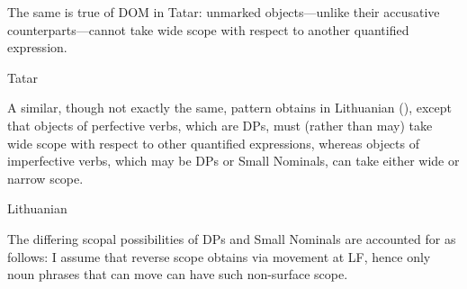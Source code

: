 \documentclass[output=paper]{langsci/langscibook}
\begin{document}
The same is true of DOM in Tatar: 
unmarked objects—unlike their accusative counterparts—cannot take wide scope with respect to another quantified expression.

\ea%
    \label{pereex:key:21}
    Tatar 
    \z 
\z 

A similar, though not exactly the same, pattern obtains in Lithuanian (\citealt{GillonArmoskaite2015}), 
except that objects of perfective verbs, which are DPs, must (rather than may) take wide scope with respect to other quantified expressions, 
whereas objects of imperfective verbs, which may be DPs or Small Nominals, can take either wide or narrow scope.

\ea%
    \label{pereex:key:22}
    Lithuanian  \citep[83]{GillonArmoskaite2015}
    \z 
\z 

The differing scopal possibilities of DPs and Small Nominals are accounted for as follows: 
I assume that reverse scope obtains via movement at LF, hence only noun phrases that can move can have such non-surface scope.
\end{document}
